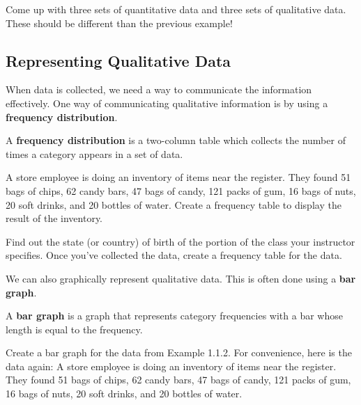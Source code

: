 \documentclass[notes]{subfiles}
\begin{document}
		\begin{ex}
			Come up with three sets of quantitative data and three sets of qualitative data.  These should be different than the previous example!
		\end{ex}

	\subsection*{Representing Qualitative Data}
		When data is collected, we need a way to communicate the information effectively.  One way of communicating qualitative information is by using a \textbf{frequency distribution}.

		\begin{defn}
			A \textbf{frequency distribution} is a two-column table which collects the number of times a category appears in a set of data.
		\end{defn}

		\begin{ex}
			A store employee is doing an inventory of items near the register.  They found 51 bags of chips, 62 candy bars, 47 bags of candy, 121 packs of gum, 16 bags of nuts, 20 soft drinks, and 20 bottles of water.  Create a frequency table to display the result of the inventory.
		\end{ex}
			\newpage

		\begin{ex}
			Find out the state (or country) of birth of the portion of the class your instructor specifies.  Once you've collected the data, create a frequency table for the data.
		\end{ex}

		We can also graphically represent qualitative data.  This is often done using a \textbf{bar graph}.
		
		\begin{defn}
			A \textbf{bar graph} is a graph that represents category frequencies with a bar whose length is equal to the frequency.
		\end{defn}

		\begin{ex}
			Create a bar graph for the data from Example 1.1.2.  For convenience, here is the data again: A store employee is doing an inventory of items near the register.  They found 51 bags of chips, 62 candy bars, 47 bags of candy, 121 packs of gum, 16 bags of nuts, 20 soft drinks, and 20 bottles of water.
		\end{ex}
			\newpage
\end{document}
